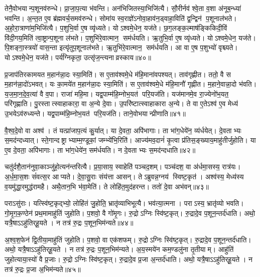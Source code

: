 तेनै॒वोभयान्प॒शूनव॑रुन्धे।
प्रा॒जा॒प॒त्या भ॑वन्ति।
अन॑भिजितस्या॒भिजि॑त्यै।
सौ॒रीर्नव॑ श्वे॒ता व॒शा अ॑नूब॒न्ध्या॑ भवन्ति।
अ॒न्त॒त ए॒व ब्र॑ह्मवर्च॒समव॑रुन्धे।
सोमा॑य स्व॒राज्ञे॑ऽनोवा॒हाव॑न॒ड्वाहा॒विति॑ द्व॒न्द्विन॑ प॒शूनाल॑भते।
अ॒हो॒रा॒त्राणा॑म॒भिजि॑त्यै।
प॒शुभि॒र्वा ए॒ष व्यृ॑ध्यते।
योऽश्वमे॒धेन॒ यज॑ते।
छ॒ग॒लङ्क॒ल्माष॑ङ्किकिदी॒विं वि॑दी॒गय॒मिति॑ त्वा॒ष्ट्रान्प॒शूना ल॑भते।
प॒शुभि॑रे॒वात्मान॒ सम॑र्धयति।
ऋ॒तुभि॒र्वा ए॒ष व्यृ॑ध्यते।
योऽश्वमे॒धेन॒ यज॑ते।
पि॒शङ्गा॒स्त्रयो॑ वास॒न्ता इत्यृ॑तुप॒शूनाल॑भते।
ऋ॒तुभि॑रे॒वात्मान॒ सम॑र्धयति।
आ वा ए॒ष प॒शुभ्यो॑ वृश्च्यते।
योऽश्वमे॒धेन॒ यज॑ते।
पर्य॑ग्निकृता॒ उत्सृ॑ज॒न्त्यनाव्रस्काय॥४०॥\anuvakamend[ल॒भ्य॒न्ते॒ ल॒भ॒ते॒ त्वा॒ष्ट्रान्प॒शूनाल॑भते॒ऽष्टौ च॑]

प्र॒जाप॑तिरकामयत म॒हान॑न्ना॒दः स्या॒मिति॑।
स ए॒ताव॑श्वमे॒धे म॑हि॒माना॑वपश्यत्।
ताव॑गृह्णीत।
ततो॒ वै स म॒हान॑न्ना॒दो॑ऽभवत्।
यः का॒मये॑त म॒हान॑न्ना॒दः स्या॒मिति॑।
स ए॒ताव॑श्वमे॒धे म॑हि॒मानौ॑ गृह्णीत।
म॒हाने॒वान्ना॒दो भ॑वति।
य॒ज॒मा॒न॒दे॒व॒त्या॑ वै व॒पा।
राजा॑ महि॒मा।
यद्व॒पाम्म॑हि॒म्नोभ॒यत॑ परि॒यज॑ति।
यज॑मानमे॒व रा॒ज्येनो॑भ॒यत॒ परि॑गृह्णाति।
पु॒रस्तात्स्वाहाकारा॒ वा अ॒न्ये दे॒वाः।
उ॒परि॑ष्टात्स्वाहाकारा अ॒न्ये।
ते वा ए॒तेऽश्व॑ ए॒व मेध्य॑ उ॒भयेऽव॑रुध्यन्ते।
यद्व॒पाम्म॑हि॒म्नोभ॒यत॑ परि॒यज॑ति।
ताने॒वोभयान्प्रीणाति॥४१॥\anuvakamend[प॒रि॒यज॑ति॒ षट्च॑]

वै॒श्व॒दे॒वो वा अश्व॑।
तं यत्प्रा॑जाप॒त्यं कु॒र्यात्।
या दे॒वता॒ अपि॑भागाः।
ता भा॑ग॒धेये॑न॒ व्य॑र्धयेत्।
दे॒वताभ्यः स॒मद॑न्दध्यात्।
स्ते॒गान्दष्ट्राभ्याम्म॒ण्डूकां॒ जम्भ्ये॑भि॒रिति॑।
आज्य॑मव॒दानं॑ कृ॒त्वा प्र॑तिस॒ङ्ख्याय॒माहु॑तीर्जुहोति।
या ए॒व दे॒वता॒ अपि॑भागाः।
ता भा॑ग॒धेये॑न॒ सम॑र्धयति।
न दे॒वताभ्यः स॒मद॑न्दधाति॥४२॥

चतु॑र्दशै॒तान॑नुवा॒काञ्जु॑हो॒त्यन॑न्तरित्यै।
प्र॒या॒साय॒ स्वाहेति॑ पञ्चद॒शम्।
पञ्च॑दश॒ वा अ॑र्धमा॒सस्य॒ रात्र॑यः।
अ॒र्ध॒मा॒स॒शः सं॑वत्स॒र आप्यते।
दे॒वा॒सु॒राः संय॑त्ता आसन्।
तेऽब्रुवन्न॒ग्नय॑ स्विष्ट॒कृत॑।
अश्व॑स्य॒ मेध्य॑स्य व॒यमु॑द्धा॒रमुद्ध॑रामहै।
अथै॒तान॒भि भ॑वा॒मेति॑।
ते लोहि॑त॒मुद॑हरन्त।
ततो॑ दे॒वा अभ॑वन्॥४३॥

पराऽसु॑राः।
यत्स्वि॑ष्ट॒कृद्भ्यो॒ लोहि॑तं जु॒होति॒ भ्रातृ॑व्याभिभूत्यै।
भव॑त्या॒त्मना।
पराऽस्य॒ भ्रातृ॑व्यो भवति।
गो॒मृ॒ग॒क॒ण्ठेन॑ प्रथ॒मामाहु॑तिं जुहोति।
प॒शवो॒ वै गो॑मृ॒गः।
रु॒द्रोऽग्निः स्वि॑ष्ट॒कृत्।
रु॒द्रादे॒व प॒शून॒न्तर्द॑धाति।
अथो॒ यत्रै॒षाऽऽहु॑तिर्‌हू॒यते।
न तत्र॑ रु॒द्रः प॒शून॒भिम॑न्यते॥४४॥

अ॒श्व॒श॒फेन॑ द्वि॒तीया॒माहु॑तिं जुहोति।
प॒शवो॒ वा एक॑शफम्।
रु॒द्रोऽग्निः स्वि॑ष्ट॒कृत्।
रु॒द्रादे॒व प॒शून॒न्तर्द॑धाति।
अथो॒ यत्रै॒षाऽऽहु॑तिर्‌हू॒यते।
न तत्र॑ रु॒द्रः प॒शून॒भिम॑न्यते।
अ॒य॒स्मये॑न कम॒ण्डलु॑ना तृ॒तीयाम्।
आहु॑तिं जुहोत्याया॒स्यो॑ वै प्र॒जाः।
रु॒द्रोऽग्निः स्वि॑ष्ट॒कृत्।
रु॒द्रादे॒व प्र॒जा अ॒न्तर्द॑धाति।
अथो॒ यत्रै॒षाऽऽहु॑तिर्‌हू॒यते।
न तत्र॑ रु॒द्रः प्र॒जा अ॒भिम॑न्यते॥४५॥\anuvakamend[द॒धा॒त्यभ॑वन्मन्यते प्र॒जा अ॒न्तर्द॑धाति॒ द्वे च॑ ]

